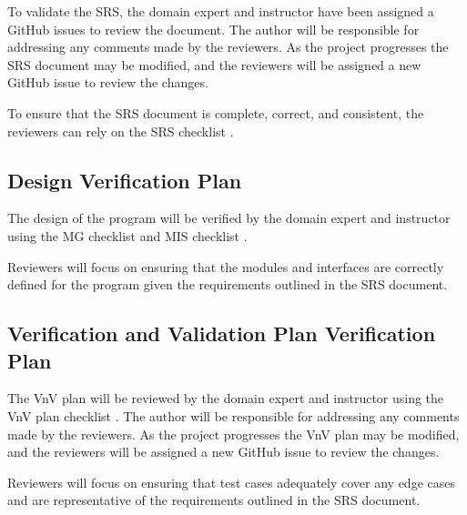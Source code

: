 \documentclass[12pt, titlepage]{article}
\begin{document}
To validate the SRS, the domain expert and instructor have been assigned a
GitHub issues to review the document. The author will be responsible for
addressing any comments made by the reviewers. As the project progresses
the SRS document may be modified, and the reviewers will be assigned a new
GitHub issue to review the changes.

To ensure that the SRS document is complete, correct, and consistent, the
reviewers can rely on the SRS checklist \citep{SRSChecklist}.

\subsection{Design Verification Plan}

The design of the \progname{} program will be verified by the domain expert and
instructor using the MG checklist \citep{MGChecklist} and MIS checklist \citep{MISChecklist}.

Reviewers will focus on ensuring that the modules and interfaces are correctly
defined for the \progname{} program given the requirements outlined in the SRS
document.





\subsection{Verification and Validation Plan Verification Plan}

The VnV plan will be reviewed by the domain expert and instructor using the 
VnV plan checklist \citep{VnVChecklist}. The author will be responsible for
addressing any comments made by the reviewers. As the project progresses the
VnV plan may be modified, and the reviewers will be assigned a new GitHub issue
to review the changes.

Reviewers will focus on ensuring that test cases adequately cover any edge cases
and are representative of the requirements outlined in the SRS document.



\end{document}

